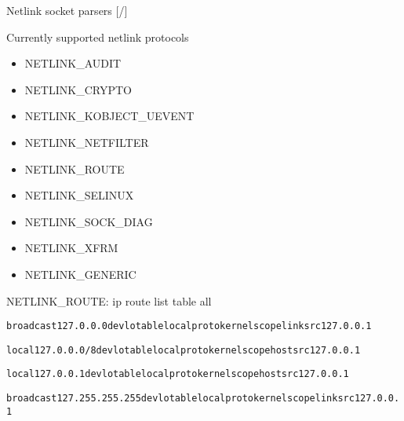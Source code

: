 \documentclass[unicode,aspectratio=169]{beamer}
\begin{document}
\begin{frame}{Netlink socket parsers \hfill [\insertframenumber/\inserttotalframenumber]}
\tiny
\begin{block}{\large Currently supported netlink protocols}
\begin{itemize}
\item NETLINK\_AUDIT
\item NETLINK\_CRYPTO
\item NETLINK\_KOBJECT\_UEVENT
\item NETLINK\_NETFILTER
\item NETLINK\_ROUTE
\item NETLINK\_SELINUX
\item NETLINK\_SOCK\_DIAG
\item NETLINK\_XFRM
\item NETLINK\_GENERIC
\end{itemize}
\end{block}

\begin{block}{\large NETLINK\_ROUTE: ip route list table all}
\begin{alltt}
broadcast 127.0.0.0 dev lo table local proto kernel scope link src 127.0.0.1

local 127.0.0.0/8 dev lo table local proto kernel scope host src 127.0.0.1

local 127.0.0.1 dev lo table local proto kernel scope host src 127.0.0.1

broadcast 127.255.255.255 dev lo table local proto kernel scope link src 127.0.0.1
\end{alltt}
\end{block}
\end{frame}
\end{document}
